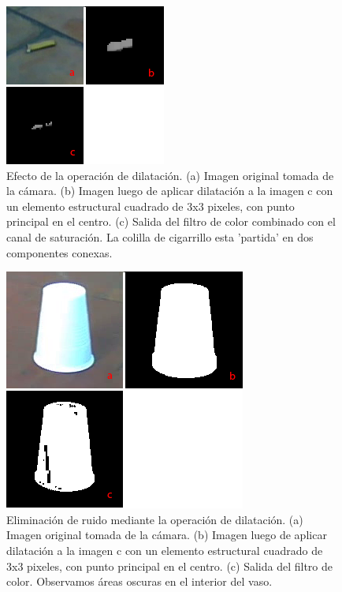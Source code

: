 \begin{figure}[tpb]
\begin{center}
  \includegraphics[scale=0.8]{figuras/dilate1.png}
\end{center}
  \caption{\small Efecto de la operación de dilatación. (a)  Imagen original tomada de la cámara. (b) Imagen luego de aplicar dilatación a la imagen c con un elemento estructural cuadrado de 3x3 pixeles, con punto principal en el centro. (c) Salida del filtro de color combinado con el canal de saturación. La colilla de cigarrillo esta 'partida' en dos componentes conexas. } 
  \label{fig:dilate}
\end{figure}

\begin{figure}[tpb]
\begin{center}

  \includegraphics[scale=0.6]{figuras/dilate-ruido.png}
\end{center}
  \caption{\small Eliminación de ruido mediante la operación de dilatación. (a) Imagen original tomada de la cámara. (b) Imagen luego de aplicar dilatación a la imagen c con un elemento estructural cuadrado de 3x3 pixeles, con punto principal en el centro. (c) Salida del filtro de color. Observamos áreas  oscuras en el interior del vaso. }
  \label{fig:dilate-ruido}
\end{figure}

